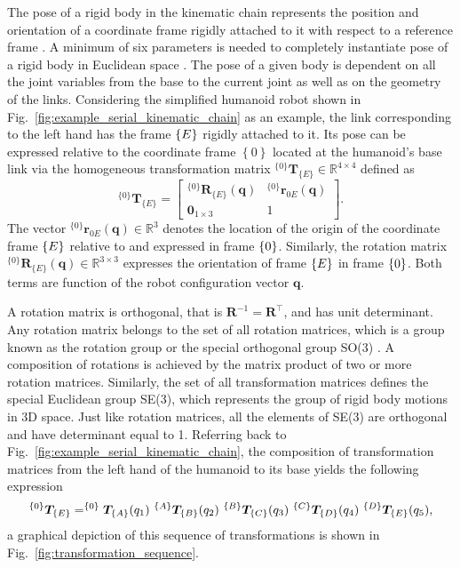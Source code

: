 The pose of a rigid body in the kinematic chain represents the position and orientation of a coordinate frame rigidly attached to it with respect to a reference frame \cite{Siciliano2008RoboticsModellingPlanning}. A minimum of six parameters is needed to completely instantiate pose of a rigid body in Euclidean space \cite{Lynch2017Modernrobotics}. The pose of a given body is dependent on all the joint variables from the base to the current joint as well as on the geometry of the links. Considering the simplified humanoid robot shown in Fig.~\ref{fig:example_serial_kinematic_chain} as an example, the link corresponding to the left hand has the frame ${\left\lbrace E \right\rbrace}$ rigidly attached to it. Its pose can be expressed relative to the coordinate frame $\left\lbrace 0 \right\rbrace$ located at the humanoid's base link via the homogeneous transformation matrix $^{\{0\}}\bm{T}_{\{E\}}  \in \mathbb{R}^{4\times 4}$ defined as
\begin{equation}
	^{\{0\}}\bm{T}_{\{E\}} = \begin{bmatrix}
		^{\{0\}}\bm{R}_{\{E\}}(\bm{q}) & ^{\{0\}}\bm{r}_{0E}(\bm{q}) \\
		\bm{0}_{1\times3} & 1
	\end{bmatrix}.
\end{equation}
The vector $^{\{0\}}\bm{r}_{0E}(\bm{q}) \in \mathbb{R}^3$ denotes the location of the origin of the coordinate frame ${\left\lbrace E \right\rbrace}$ relative to and expressed in frame ${\left\lbrace 0 \right\rbrace}$. Similarly, the rotation matrix $^{\{0\}}\bm{R}_{\{E\}}(\bm{q})  \in \mathbb{R}^{3\times 3}$ expresses the orientation of frame ${\left\lbrace E \right\rbrace}$ in frame ${\left\lbrace 0 \right\rbrace}$. Both terms are function of the robot configuration vector $\bm{q}$.

A rotation matrix is orthogonal, that is $ \bm{R}^{-1} = \bm{R}^\intercal$, and has unit determinant. Any rotation matrix belongs to the set of all rotation matrices, which is a group known as the rotation group or the special orthogonal group SO(3) \cite{Lynch2017Modernrobotics}. A composition of rotations is achieved by the matrix product of two or more rotation matrices. Similarly, the set of all transformation matrices defines the special Euclidean group SE(3), which represents the group of rigid body motions in 3D space. Just like rotation matrices, all the elements of SE(3) are orthogonal and have determinant equal to 1. Referring back to Fig.~\ref{fig:example_serial_kinematic_chain}, the composition of transformation matrices from the left hand of the humanoid to its base yields the following expression
\begin{equation}
	^{\left\lbrace 0 \right\rbrace}\bm{T}_{\left\lbrace E \right\rbrace} = 
	^{\left\lbrace 0 \right\rbrace}\bm{T}_{\left\lbrace A \right\rbrace}(q_1)~
	^{\left\lbrace A \right\rbrace}\bm{T}_{\left\lbrace B \right\rbrace}(q_2)~
	^{\left\lbrace B \right\rbrace}\bm{T}_{\left\lbrace C \right\rbrace}(q_3)~
	^{\left\lbrace C \right\rbrace}\bm{T}_{\left\lbrace D \right\rbrace}(q_4)~
	^{\left\lbrace D \right\rbrace}\bm{T}_{\left\lbrace E \right\rbrace}(q_5),
\end{equation}
a graphical depiction of this sequence of transformations is shown in Fig.~\ref{fig:transformation_sequence}.

